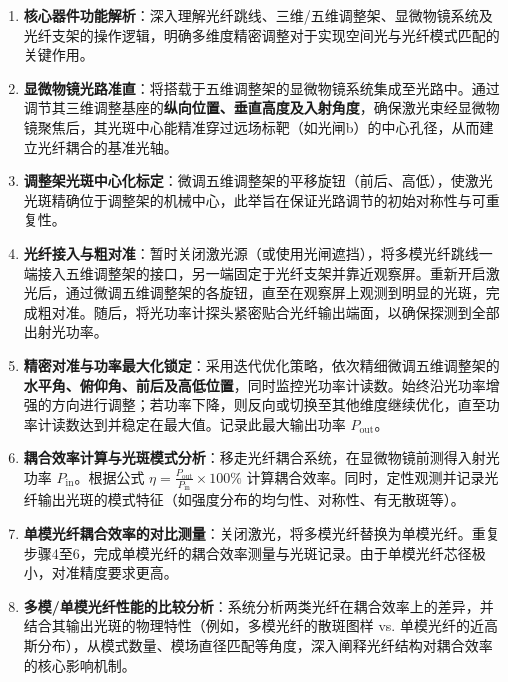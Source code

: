 \documentclass[11pt]{article}
\begin{document}
\begin{enumerate}
    \item \textbf{核心器件功能解析}：深入理解光纤跳线、三维/五维调整架、显微物镜系统及光纤支架的操作逻辑，明确多维度精密调整对于实现空间光与光纤模式匹配的关键作用。

    \item \textbf{显微物镜光路准直}：将搭载于五维调整架的显微物镜系统集成至光路中。通过调节其三维调整基座的\textbf{纵向位置、垂直高度及入射角度}，确保激光束经显微物镜聚焦后，其光斑中心能精准穿过远场标靶（如光闸b）的中心孔径，从而建立光纤耦合的基准光轴。

    \item \textbf{调整架光斑中心化标定}：微调五维调整架的平移旋钮（前后、高低），使激光光斑精确位于调整架的机械中心，此举旨在保证光路调节的初始对称性与可重复性。

    \item \textbf{光纤接入与粗对准}：暂时关闭激光源（或使用光闸遮挡），将多模光纤跳线一端接入五维调整架的接口，另一端固定于光纤支架并靠近观察屏。重新开启激光后，通过微调五维调整架的各旋钮，直至在观察屏上观测到明显的光斑，完成粗对准。随后，将光功率计探头紧密贴合光纤输出端面，以确保探测到全部出射光功率。

    \item \textbf{精密对准与功率最大化锁定}：采用迭代优化策略，依次精细微调五维调整架的\textbf{水平角、俯仰角、前后及高低位置}，同时监控光功率计读数。始终沿光功率增强的方向进行调整；若功率下降，则反向或切换至其他维度继续优化，直至功率计读数达到并稳定在最大值。记录此最大输出功率 \(P_{\text{out}}\)。

    \item \textbf{耦合效率计算与光斑模式分析}：移走光纤耦合系统，在显微物镜前测得入射光功率 \(P_{\text{in}}\)。根据公式 \(\eta = \frac{P_{\text{out}}}{P_{\text{in}}} \times 100\%\) 计算耦合效率。同时，定性观测并记录光纤输出光斑的模式特征（如强度分布的均匀性、对称性、有无散斑等）。

    \item \textbf{单模光纤耦合效率的对比测量}：关闭激光，将多模光纤替换为单模光纤。重复步骤4至6，完成单模光纤的耦合效率测量与光斑记录。由于单模光纤芯径极小，对准精度要求更高。

    \item \textbf{多模/单模光纤性能的比较分析}：系统分析两类光纤在耦合效率上的差异，并结合其输出光斑的物理特性（例如，多模光纤的散斑图样 vs. 单模光纤的近高斯分布），从模式数量、模场直径匹配等角度，深入阐释光纤结构对耦合效率的核心影响机制。
\end{enumerate}
\end{document}
